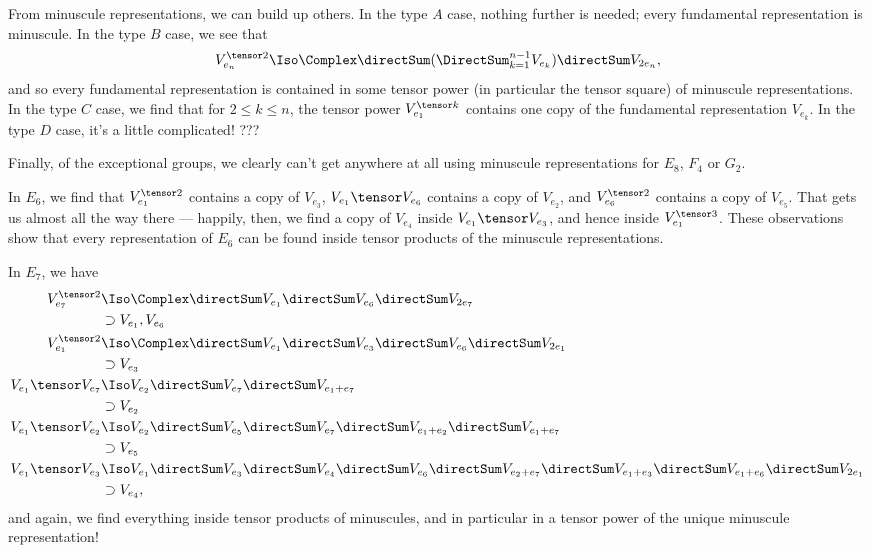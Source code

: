 From minuscule representations, we can build up others. In the type $A$ case, nothing further is needed; every fundamental
representation is minuscule. In the type $B$ case, we see that
$$V_{e_n}^{\tensor 2} \Iso \Complex \directSum (\DirectSum_{k=1}^{n-1} V_{e_k}) \directSum V_{2e_n},$$
and so every fundamental representation is contained in some tensor power (in particular the tensor square) of minuscule representations.
In the type $C$ case, we find that for $2 \leq k \leq n$, the tensor power $V_{e_1}^{\tensor k}$ contains one copy of the fundamental representation
$V_{e_k}$.
In the type $D$ case, it's a little complicated! ???

Finally, of the exceptional groups, we clearly can't get anywhere at all using minuscule representations for $E_8$, $F_4$ or $G_2$.

In $E_6$,
we find that $V_{e_1}^{\tensor 2}$ contains a copy of $V_{e_3}$, $V_{e_1} \tensor V_{e_6}$ contains a copy of $V_{e_2}$, and $V_{e_6}^{\tensor 2}$ contains a copy of $V_{e_5}$.
That gets us almost all the way there --- happily, then, we find a copy of $V_{e_4}$ inside $V_{e_1} \tensor V_{e_3}$, and hence inside $V_{e_1}^{\tensor 3}$.
These observations show that every representation of $E_6$ can be found inside tensor products of the minuscule representations.

In $E_7$, we have
\begin{align*}
V_{e_7}^{\tensor 2} & \Iso \Complex \directSum V_{e_1} \directSum V_{e_6} \directSum V_{2e_7} \\
                    & \supset V_{e_1}, V_{e_6} \\
V_{e_1}^{\tensor 2} & \Iso \Complex \directSum V_{e_1} \directSum V_{e_3} \directSum V_{e_6} \directSum V_{2e_1} \\
                    & \supset V_{e_3} \\
V_{e_1} \tensor V_{e_7} & \Iso V_{e_2} \directSum V_{e_7} \directSum V_{e_1+e_7} \\
                        & \supset V_{e_2} \\
V_{e_1} \tensor V_{e_2} & \Iso V_{e_2} \directSum V_{e_5} \directSum V_{e_7} \directSum V_{e_1 + e_2} \directSum V_{e_1 + e_7} \\
                        & \supset V_{e_5} \\
V_{e_1} \tensor V_{e_3} & \Iso V_{e_1} \directSum V_{e_3} \directSum V_{e_4} \directSum V_{e_6} \directSum V_{e_2 + e_7}\directSum V_{e_1+e_3} \directSum V_{e_1+e_6}\directSum V_{2e_1}\\
                        & \supset V_{e_4},
\end{align*}
and again, we find everything inside tensor products of minuscules, and in particular in a tensor power of the unique minuscule representation!

